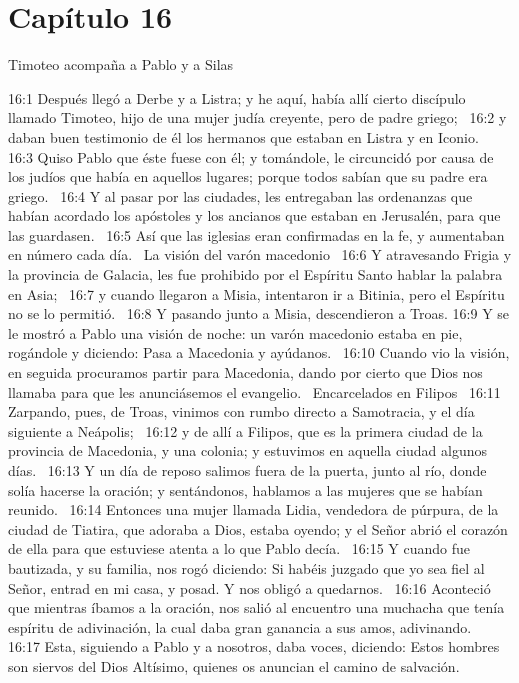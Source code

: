 \section*{Capítulo 16}
Timoteo acompaña a Pablo y a Silas 

16:1 Después llegó a Derbe y a Listra; y he aquí, había allí cierto discípulo llamado Timoteo, hijo de una mujer judía creyente, pero de padre griego;  
16:2 y daban buen testimonio de él los hermanos que estaban en Listra y en Iconio.  
16:3 Quiso Pablo que éste fuese con él; y tomándole, le circuncidó por causa de los judíos que había en aquellos lugares; porque todos sabían que su padre era griego.  
16:4 Y al pasar por las ciudades, les entregaban las ordenanzas que habían acordado los apóstoles y los ancianos que estaban en Jerusalén, para que las guardasen.  
16:5 Así que las iglesias eran confirmadas en la fe, y aumentaban en número cada día.  
La visión del varón macedonio  
16:6 Y atravesando Frigia y la provincia de Galacia, les fue prohibido por el Espíritu Santo hablar la palabra en Asia;  
16:7 y cuando llegaron a Misia, intentaron ir a Bitinia, pero el Espíritu no se lo permitió.  
16:8 Y pasando junto a Misia, descendieron a Troas. 
16:9 Y se le mostró a Pablo una visión de noche: un varón macedonio estaba en pie, rogándole y diciendo: Pasa a Macedonia y ayúdanos.  
16:10 Cuando vio la visión, en seguida procuramos partir para Macedonia, dando por cierto que Dios nos llamaba para que les anunciásemos el evangelio.  
Encarcelados en Filipos  
16:11 Zarpando, pues, de Troas, vinimos con rumbo directo a Samotracia, y el día siguiente a Neápolis;  
16:12 y de allí a Filipos, que es la primera ciudad de la provincia de Macedonia, y una colonia; y estuvimos en aquella ciudad algunos días.  
16:13 Y un día de reposo salimos fuera de la puerta, junto al río, donde solía hacerse la oración; y sentándonos, hablamos a las mujeres que se habían reunido.  
16:14 Entonces una mujer llamada Lidia, vendedora de púrpura, de la ciudad de Tiatira, que adoraba a Dios, estaba oyendo; y el Señor abrió el corazón de ella para que estuviese atenta a lo que Pablo decía.  
16:15 Y cuando fue bautizada, y su familia, nos rogó diciendo: Si habéis juzgado que yo sea fiel al Señor, entrad en mi casa, y posad. Y nos obligó a quedarnos.  
16:16 Aconteció que mientras íbamos a la oración, nos salió al encuentro una muchacha que tenía espíritu de adivinación, la cual daba gran ganancia a sus amos, adivinando.  
16:17 Esta, siguiendo a Pablo y a nosotros, daba voces, diciendo: Estos hombres son siervos del Dios Altísimo, quienes os anuncian el camino de salvación.  

